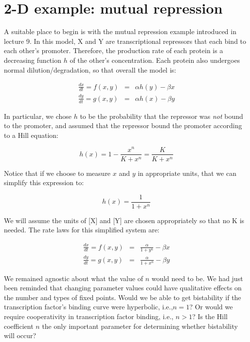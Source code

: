 \documentclass{article}
\begin{document}
\large

\section*{2-D example: mutual repression}

A suitable place to begin is with the mutual repression example introduced in lecture 9. In this model, X and Y are transcriptional repressors that each bind to each other's promoter. Therefore, the production rate of each protein is a decreasing function $h$ of the other's concentration. Each protein also undergoes normal dilution/degradation, so that overall the model is:

\begin{eqnarray*}
\frac{dx}{dt} = f(x,y)  & =  & \alpha h(y)  -  \beta x\\
\frac{dy}{dt} = g(x,y) &=  &  \alpha h(x) - \beta y
\end{eqnarray*}

In particular, we chose $h$ to be the probability that the repressor was \textit{not} bound to the promoter, and assumed that the repressor bound the promoter according to a Hill equation:

\[ h(x) = 1 - \frac{x^n}{K + x^n} = \frac{K}{K+ x^n} \]

Notice that if we choose to measure $x$ and $y$ in appropriate units, that we can simplify this expression to:

\[ h(x) = \frac{1}{1+ x^n} \]

We will assume the units of [X] and [Y] are chosen appropriately so that no K is needed. The rate laws for this simplified system are:

\begin{eqnarray*}
\frac{dx}{dt} = f(x,y)  & =  & \frac{\alpha }{1+ y^n}  -  \beta x\\
\frac{dy}{dt} = g(x,y) &=  &  \frac{\alpha }{1+ x^n} - \beta y
\end{eqnarray*}

We remained agnostic about what the value of $n$ would need to be. We had just been reminded that changing parameter values could have qualitative effects on the number and types of fixed points. Would we be able to get bistability if the transcription factor's binding curve were hyperbolic, i.e.,$n=1$? Or would we require cooperativity in transcription factor binding, i.e., $n>1$? Is the Hill coefficient $n$ the only important parameter for determining whether bistability will occur?\\
\end{document}
